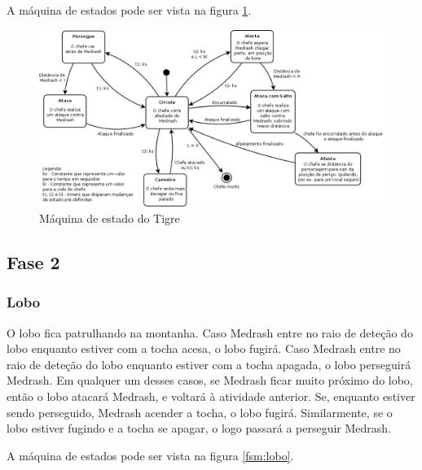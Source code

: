 A máquina de estados pode ser vista na figura \ref{fsm:tigre}.

\begin{figure}[!ht]
 \centering
 \includegraphics[scale=0.44]{ia_tigre.png}
 \caption{Máquina de estado do Tigre}
 \label{fsm:tigre}
\end{figure}

\subsection{Fase 2}

\subsubsection{Lobo}

O lobo fica patrulhando na montanha. Caso Medrash entre no raio de
deteção do lobo enquanto estiver com a tocha acesa, o lobo fugirá. Caso
Medrash entre no raio de deteção do lobo enquanto estiver com a tocha
apagada, o lobo perseguirá Medrash. Em qualquer um desses casos, se
Medrash ficar muito próximo do lobo, então o lobo atacará Medrash, e
voltará à atividade anterior.
Se, enquanto estiver sendo perseguido, Medrash acender a tocha,
o lobo fugirá. Similarmente, se o lobo estiver fugindo e a tocha se apagar,
o logo passará a perseguir Medrash.

A máquina de estados pode ser vista na figura \ref{fsm:lobo}.


